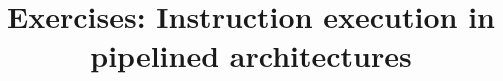

\title{Exercises: Instruction execution in pipelined architectures}



\maketitle

\pagestyle{fancyplain}





